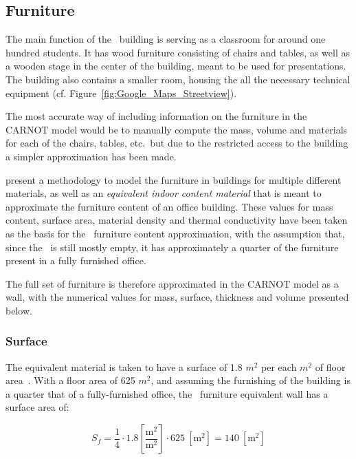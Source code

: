 \subsection{Furniture}

The main function of the \pdome\ building is serving as a classroom for around
one hundred students. It has wood furniture consisting of chairs and tables, as
well as a wooden stage in the center of the building, meant to be used for
presentations. The building also contains a smaller room, housing the all the
necessary technical equipment (cf. Figure~\ref{fig:Google_Maps_Streetview}).

The most accurate way of including information on the furniture in the CARNOT
model would be to manually compute the mass, volume and materials for each of
the chairs, tables, etc.\ but due to the restricted access to the building a
simpler approximation has been made.

\textcite{johraNumericalAnalysisImpact2017} present a methodology to model the
furniture in buildings for multiple different materials, as well as an
\textit{equivalent indoor content material} that is meant to approximate the
furniture content of an office building. These values for mass content, surface
area, material density and thermal conductivity have been taken as the basis for
the \pdome\ furniture content approximation, with the assumption that, since the
\pdome\ is still mostly empty, it has approximately a quarter of the furniture
present in a fully furnished office.

The full set of furniture is therefore approximated in the CARNOT model as a
wall, with the numerical values for mass, surface, thickness and volume
presented below.

\subsubsection*{Surface}

The equivalent material is taken to have a surface of 1.8 $m^2$ per each $m^2$
of floor area~\cite{johraNumericalAnalysisImpact2017}. With a floor area of 625
$m^2$, and assuming the furnishing of the building is a quarter that of a
fully-furnished office, the \pdome\ furniture equivalent wall has a surface area
of:

\begin{equation}
    S_f = \frac{1}{4} \cdot 1.8 \left[\frac{\text{m}^2}{\text{m}^2}\right]
    \cdot 625\ \left[\text{m}^2\right] = 140\ \left[\text{m}^2\right]
\end{equation}


